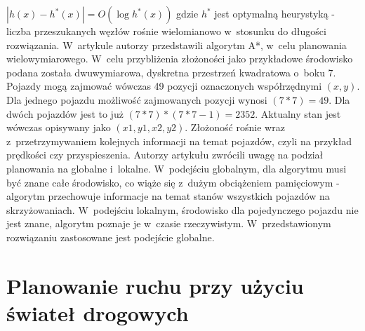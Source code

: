 \newline
\newline
\begin{math}
|h(x)-h^{*}(x)|=O(\log h^{*}(x))
\end{math}
\newline
\newline
gdzie \begin{math}h^{*}\end{math} jest optymalną heurystyką - liczba przeszukanych węzłów rośnie wielomianowo w~stosunku do długości rozwiązania.
\newline
\indent
W~artykule \cite{wojnicki2015robust} autorzy przedstawili algorytm A*, w~celu planowania wielowymiarowego. W~celu przybliżenia złożoności jako przykładowe środowisko podana została dwuwymiarowa, dyskretna przestrzeń kwadratowa o~boku 7. Pojazdy mogą zajmować wówczas 49 pozycji oznaczonych współrzędnymi \begin{math}(x, y)\end{math}. Dla jednego pojazdu możliwość zajmowanych pozycji wynosi \begin{math}(7 * 7) = 49 \end{math}. Dla dwóch pojazdów jest to już \begin{math}(7 * 7) * (7 * 7 - 1) = 2352 \end{math}. Aktualny stan jest wówczas opisywany jako \begin{math}(x1, y1, x2, y2)\end{math}. Złożoność rośnie wraz z~przetrzymywaniem kolejnych informacji na temat pojazdów, czyli na przykład prędkości czy przyspieszenia.
\newline
\indent
Autorzy artykułu \cite{leena2014survey} zwrócili uwagę na podział planowania na globalne i~lokalne. W~podejściu globalnym, dla algorytmu musi być znane całe środowisko, co wiąże się z~dużym obciążeniem pamięciowym - algorytm przechowuje informacje na temat stanów wszystkich pojazdów na skrzyżowaniach. W~podejściu lokalnym, środowisko dla pojedynczego pojazdu nie jest znane, algorytm poznaje je w~czasie rzeczywistym. W~przedstawionym rozwiązaniu zastosowane jest podejście globalne.

\section{Planowanie ruchu przy użyciu świateł drogowych}

